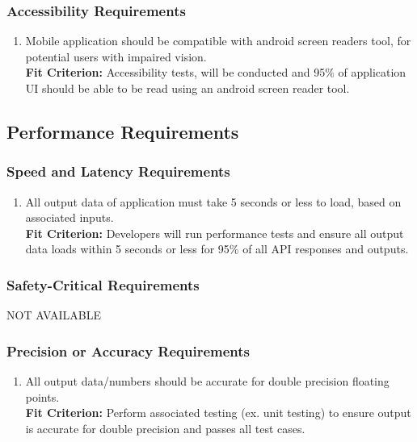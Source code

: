 \documentclass[12pt,letterpaper]{article}
\begin{document}
\subsubsection{Accessibility Requirements}
\begin{enumerate}[resume*] 
\item Mobile application should be compatible with android screen readers tool, for potential users with impaired vision.\\
{\textbf{Fit Criterion:} Accessibility tests, will be conducted and 95\% of application UI should be able to be read using an android screen reader tool.}
\end{enumerate}

\subsection{Performance Requirements}
\subsubsection{Speed and Latency Requirements}
\begin{enumerate}[{PE}1.] 
\item All output data of application must take 5 seconds or less to load, based on associated inputs.\\
{\textbf{Fit Criterion:} Developers will run performance tests and ensure all output data loads within 5 seconds or less for 95\% of all API responses and outputs.}
\end{enumerate}

\subsubsection{Safety-Critical Requirements}
\noindent NOT AVAILABLE

\subsubsection{Precision or Accuracy Requirements}
\begin{enumerate}[resume*] 
\item All output data/numbers should be accurate for double precision floating points.\\
{\textbf{Fit Criterion:} Perform associated testing (ex. unit testing) to ensure output is accurate for double precision and passes all test cases. }
\end{enumerate}
\end{document}
